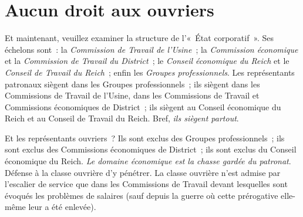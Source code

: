 \documentclass[french,twoside]{book} %
\begin{document}
\section[Aucun droit aux ouvriers]{Aucun droit aux ouvriers}
\noindent Et maintenant, veuillez examiner la structure de l’« État corporatif ». Ses échelons sont : la \emph{Commission de Travail de l’Usine} ; la \emph{Commission économique} et la \emph{Commission de Travail du District} ; le \emph{Conseil économique du Reich} et le \emph{Conseil de Travail du Reich} ; enfin les \emph{Groupes professionnels}. Les représentants patronaux siègent dans les Groupes professionnels ; ils siègent dans les Commissions de Travail de l’Usine, dans les Commissions de Travail et Commissions économiques de District ; ils siègent au Conseil économique du Reich et au Conseil de Travail du Reich. Bref, \emph{ils siègent partout}.\par
Et les représentants ouvriers ? Ils sont exclus des Groupes professionnels ; ils sont exclus des Commissions économiques de District ; ils sont exclus du Conseil économique du Reich. \emph{Le domaine économique est la chasse gardée du patronat}. Défense à la classe ouvrière d’y pénétrer. La classe ouvrière n’est admise par l’escalier de service que dans les Commissions de Travail devant lesquelles sont évoqués les problèmes de salaires (sauf depuis la guerre où cette prérogative elle-même leur a été enlevée).
\end{document}
